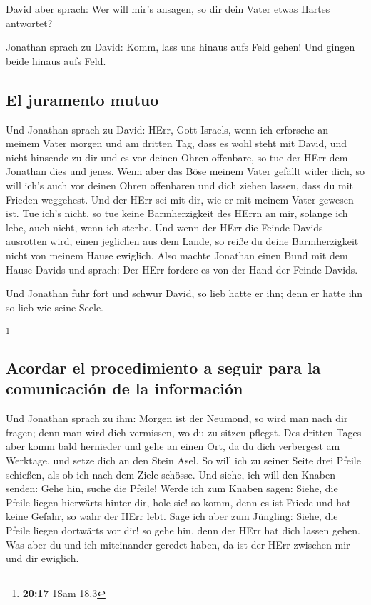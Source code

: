  David aber sprach: Wer will mir's ansagen, so dir dein
Vater etwas Hartes antwortet?

 Jonathan sprach zu David: Komm, lass uns hinaus aufs
Feld gehen! Und gingen beide hinaus aufs Feld.

\hypertarget{el-juramento-mutuo}{%
\subsection{El juramento mutuo}\label{el-juramento-mutuo}}

 Und Jonathan sprach zu David: HErr, Gott Israels, wenn
ich erforsche an meinem Vater morgen und am dritten Tag, dass es wohl
steht mit David, und nicht hinsende zu dir und es vor deinen Ohren
offenbare,  so tue der HErr dem Jonathan dies und jenes.
Wenn aber das Böse meinem Vater gefällt wider dich, so will ich's auch
vor deinen Ohren offenbaren und dich ziehen lassen, dass du mit Frieden
weggehest. Und der HErr sei mit dir, wie er mit meinem Vater gewesen
ist.  Tue ich's nicht, so tue keine Barmherzigkeit des
HErrn an mir, solange ich lebe, auch nicht, wenn ich sterbe.
 Und wenn der HErr die Feinde Davids ausrotten wird,
einen jeglichen aus dem Lande, so reiße du deine Barmherzigkeit nicht
von meinem Hause ewiglich.  Also machte Jonathan einen
Bund mit dem Hause Davids und sprach: Der HErr fordere es von der Hand
der Feinde Davids.

 Und Jonathan fuhr fort und schwur David, so lieb hatte
er ihn; denn er hatte ihn so lieb wie seine Seele.

\footnote{\textbf{20:17} 1Sam 18,3}

\hypertarget{acordar-el-procedimiento-a-seguir-para-la-comunicaciuxf3n-de-la-informaciuxf3n}{%
\subsection{Acordar el procedimiento a seguir para la comunicación de la
información}\label{acordar-el-procedimiento-a-seguir-para-la-comunicaciuxf3n-de-la-informaciuxf3n}}

 Und Jonathan sprach zu ihm: Morgen ist der Neumond, so
wird man nach dir fragen; denn man wird dich vermissen, wo du zu sitzen
pflegst.  Des dritten Tages aber komm bald hernieder und
gehe an einen Ort, da du dich verbergest am Werktage, und setze dich an
den Stein Asel.  So will ich zu seiner Seite drei Pfeile
schießen, als ob ich nach dem Ziele schösse.  Und siehe,
ich will den Knaben senden: Gehe hin, suche die Pfeile! Werde ich zum
Knaben sagen: Siehe, die Pfeile liegen hierwärts hinter dir, hole sie!
so komm, denn es ist Friede und hat keine Gefahr, so wahr der HErr lebt.
 Sage ich aber zum Jüngling: Siehe, die Pfeile liegen
dortwärts vor dir! so gehe hin, denn der HErr hat dich lassen gehen.
 Was aber du und ich miteinander geredet haben, da ist
der HErr zwischen mir und dir ewiglich.

